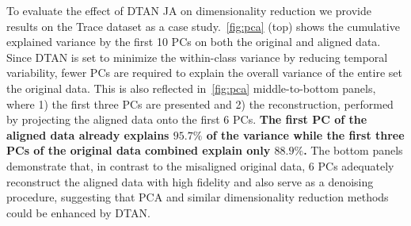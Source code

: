 To evaluate the effect of DTAN JA on dimensionality reduction we provide results on the Trace dataset as a case study.~\autoref{fig:pca} (top) shows the cumulative explained variance by 
the first 10 PCs on both the original and aligned data. Since DTAN is set to minimize the within-class variance
by reducing temporal variability, fewer PCs are required to explain the overall variance of the entire set \wrt the original data. This is also reflected in~\autoref{fig:pca} middle-to-bottom panels, where 1) the first three PCs are presented and 2) 
the reconstruction, performed by projecting the aligned data onto the first 6 PCs. 
\textbf{The first PC of the aligned data already explains $95.7\%$ of the variance while the first three PCs of the original 
data combined explain only $88.9\%$.}
The bottom panels demonstrate that, in contrast to the misaligned original data, 6 PCs adequately reconstruct the aligned data with high fidelity and also serve as a denoising procedure, suggesting that PCA and similar dimensionality reduction methods could be enhanced by DTAN.
